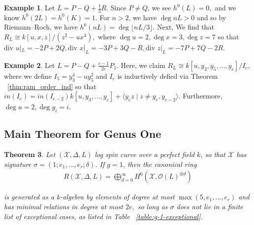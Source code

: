 \documentclass{amsart}
\theoremstyle{plain}
\newtheorem{thm}{Theorem}[section]
\theoremstyle{definition}
\newtheorem{example}[thm]{Example}
\theoremstyle{remark}
\numberwithin{equation}{section}
\newcommand\ssec{\subsection}
\newcommand \sx{\mathscr X}
\newcommand\sco{{\mathscr O}}
\newcommand \di{\text{div }}
\newcommand \halfcan{L}
\begin{document}
\begin{example}
\label{eg:exceptional- 1-3}
Let $L = P - Q + \frac{1}{3}R$. Since $P \neq Q$, we see $h^0(L) = 0,$ and we know $h^0(2L) = h^0(K) = 1$. For $n > 2$, we have $\deg nL > 0$ and so by Riemann--Roch, we have $h^0(nL) = \deg \lfloor nL/3 \rfloor.$ Next, 
We find that $R_L \cong k[u, x,z]/(z^2 - ux^4),$ where $\deg u = 2, \deg x = 3, \deg z = 7$ so that $\di u|_L = -2P + 2Q, \di x|_L = -3P + 3Q - R, \di z|_L = -7P + 7Q - 2R.$
\end{example}


\begin{example}
\label{eg:exception-1-e}
Let $L = P - Q + \frac{e- 1}{2e}P_1.$ Here, we claim $R_L \cong k[u, y_3, y_5, \ldots, y_e]/I_e,$ where we define $I_5 = y_3^4 - uy_5^2$ and $I_e$ is inductively defied via Theorem ~\ref{thm:ram_order_ind} so that $in(I_e) = in(I_{e-2})k[u, y_3, \ldots, y_e] + \langle y_e z \mid z \neq y_e, y_{e-2} \rangle.$
Furthermore, $\deg u = 2, \deg y_i = i$.
\end{example}
\fi


\ssec{Main Theorem for Genus One}
\label{ssec:main_g_1}

\begin{thm}
\label{thm:g_1_generators_relations}
Let $(\sx, \Delta, \halfcan)$ log spin curve over a perfect field $k$,
so that $\sx$ has signature $\sigma = (1; e_1, \ldots, e_r; \delta)$.
If $g = 1$, then the canonical ring
\begin{align*}
	R(\sx, \Delta, \halfcan) = \bigoplus_{d = 0}^\infty H^0(\sx, \sco(L)^{\otimes d})
\end{align*}

\noindent
is generated as a $k$-algebra by elements of degree at most $\max(5, e_1, \ldots, e_r)$ and has minimal relations in degree at most $2e,$ so long as $\sigma$ does not lie in a
finite list of exceptional cases, as listed in Table
~\ref{table:g-1-exceptional}.
\end{thm}
\end{document}

